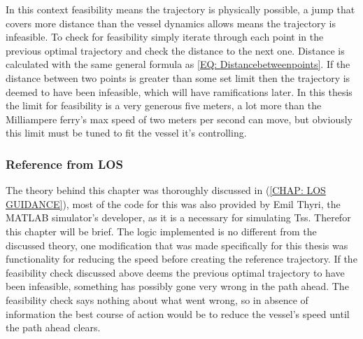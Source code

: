 In this context feasibility means the trajectory is physically possible, a jump that covers more distance than the vessel
dynamics allows means the trajectory is infeasible. To check for feasibility simply iterate through each point in the previous
optimal trajectory and check the distance to the next one. Distance is calculated with the same general formula as \eqref{EQ: Distancebetweenpoints}.
If the distance between two points is greater than some set limit then the trajectory is deemed to have been infeasible, which will have
ramifications later. In this thesis the limit for feasibility is a very generous five meters, a lot more than the Milliampere ferry's max speed of
two meters per second can move, but obviously this limit must be tuned to fit the vessel it's controlling.


\subsubsection*{Reference from LOS}
The theory behind this chapter was thoroughly discussed in (\ref{CHAP: LOS GUIDANCE}), most of the code for this was also provided by
Emil Thyri, the MATLAB simulator's developer, as it is a necessary for simulating \gls{Ts}s. Therefor this chapter will be brief. The logic implemented
is no different from the discussed theory, one modification that was made specifically for this thesis was functionality for reducing the speed
before creating the reference trajectory. If the feasibility check discussed above deems the previous optimal trajectory to have been infeasible, something
has possibly gone very wrong in the path ahead. The feasibility check says nothing about what went wrong, so in absence of information the best
course of action would be to reduce the vessel's speed until the path ahead clears. 

